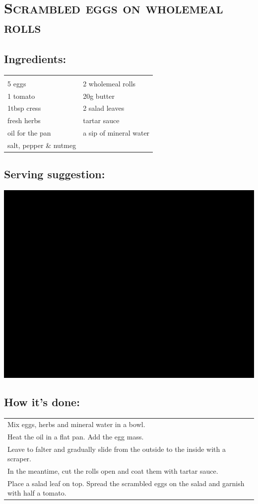 \section{\textsc{Scrambled eggs on wholemeal rolls}}

\subsection*{Ingredients:}

\begin{tabular}{p{7.5cm} p{7.5cm}}
	& \\
	5 eggs & 2 wholemeal rolls \\
	1 tomato & 20g butter \\
  1tbsp cress & 2 salad leaves \\
  fresh herbs & tartar sauce \\
  oil for the pan & a sip of mineral water \\
  salt, pepper \& nutmeg
\end{tabular}

\subsection*{Serving suggestion:}

\includegraphics[width=\textwidth]{img/ph.jpg} \cite{ruehreivollkorn}

\subsection*{How it's done:}

\begin{tabular}{p{15cm}}
	\\
  Mix eggs, herbs and mineral water in a bowl.\\
  Heat the oil in a flat pan. Add the egg mass.\\
  Leave to falter and gradually slide from the outside to the inside with a scraper.\\
  In the meantime, cut the rolls open and coat them with tartar sauce.\\
  Place a salad leaf on top. Spread the scrambled eggs on the salad and garnish with half a tomato.
\end{tabular}
